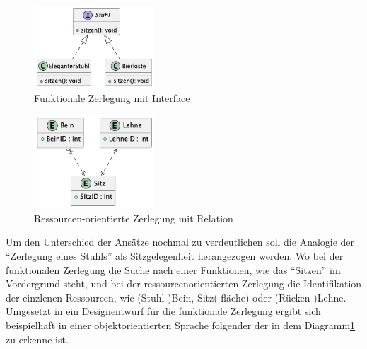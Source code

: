 \begin{figure}[ht!]
  \centering
  \includegraphics[width=0.4\textwidth]{fig/uml/stuhl-function.png}
  \caption{Funktionale Zerlegung mit Interface}
  \label{fig:stuhl-f}
\end{figure}

\begin{figure}[ht!]
  \centering
  \includegraphics[width=0.4\textwidth]{fig/uml/stuhl-resourcen.png}
  \caption{Ressourcen-orientierte Zerlegung mit Relation}
  \label{fig:stuhl-r}
\end{figure}
Um den Unterschied der Ansätze nochmal zu verdeutlichen soll die Analogie der \enquote{Zerlegung eines Stuhls} als Sitzgelegenheit herangezogen werden. Wo bei der funktionalen Zerlegung die Suche nach einer Funktionen, wie das \enquote{Sitzen} im Vordergrund steht, und bei der ressourcenorientierten Zerlegung die Identifikation der einzlenen Ressourcen, wie (Stuhl-)Bein, Sitz(-fläche) oder (Rücken-)Lehne. Umgesetzt in ein Designentwurf für die funktionale Zerlegung ergibt sich beispielhaft in einer objektorientierten Sprache folgender der in dem Diagramm\ref{fig:stuhl-f} zu erkenne ist. 


